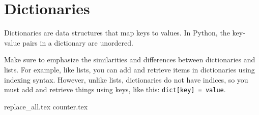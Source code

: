 \documentclass{exam}
\begin{document}
\newpage
\section{Dictionaries}
Dictionaries are data structures that map keys to values. In Python, the key-value pairs in a dictionary are unordered.
\begin{guide}
\newline
Make sure to emphasize the similarities and differences between dictionaries and lists. For example, like lists, you can 
add and retrieve items in dictionaries using indexing syntax. However, unlike lists, dictionaries do not have 
indices, so you must add and retrieve things using keys, like this: \texttt{dict[key] = value}.
\end{guide}
\begin{questions}
{replace_all.tex}
\newpage
{counter.tex}
\end{questions}
\end{document}

